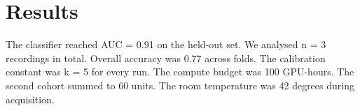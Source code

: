 \section{Results}
The classifier reached AUC = 0.91 on the held-out set.
We analysed n = 3 recordings in total.
Overall accuracy was 0.77 across folds.
The calibration constant was k = 5 for every run.
The compute budget was 100 GPU-hours.
The second cohort summed to 60 units.
The room temperature was 42 degrees during acquisition.
